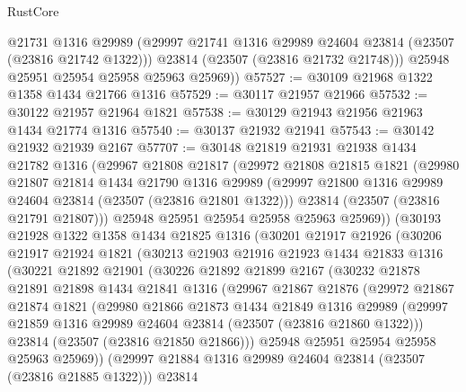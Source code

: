 \begin{lexlean}{RustCore}
\begin{coremodule}
          @21731
          @1316
          @29989
          (@29997 @21741 @1316 @29989 @24604 @23814 (@23507 (@23816 @21742 @1322)))
          @23814
          (@23507 (@23816 @21732 @21748)))
        @25948
        @25951
        @25954
        @25958
        @25963
        @25969))
@57527 := @30109 @21968 @1322 @1358 @1434 @21766 @1316
@57529 := @30117 @21957 @21966
@57532 := @30122 @21957 @21964 @1821
@57538 := @30129 @21943 @21956 @21963 @1434 @21774 @1316
@57540 := @30137 @21932 @21941
@57543 := @30142 @21932 @21939 @2167
@57707 := @30148
    @21819
    @21931
    @21938
    @1434
    @21782
    @1316
    (@29967
      @21808
      @21817
      (@29972
        @21808
        @21815
        @1821
        (@29980
          @21807
          @21814
          @1434
          @21790
          @1316
          @29989
          (@29997 @21800 @1316 @29989 @24604 @23814 (@23507 (@23816 @21801 @1322)))
          @23814
          (@23507 (@23816 @21791 @21807)))
        @25948
        @25951
        @25954
        @25958
        @25963
        @25969))
    (@30193
      @21928
      @1322
      @1358
      @1434
      @21825
      @1316
      (@30201
        @21917
        @21926
        (@30206
          @21917
          @21924
          @1821
          (@30213
            @21903
            @21916
            @21923
            @1434
            @21833
            @1316
            (@30221
              @21892
              @21901
              (@30226
                @21892
                @21899
                @2167
                (@30232
                  @21878
                  @21891
                  @21898
                  @1434
                  @21841
                  @1316
                  (@29967
                    @21867
                    @21876
                    (@29972
                      @21867
                      @21874
                      @1821
                      (@29980
                        @21866
                        @21873
                        @1434
                        @21849
                        @1316
                        @29989
                        (@29997 @21859 @1316 @29989 @24604 @23814 (@23507 (@23816 @21860 @1322)))
                        @23814
                        (@23507 (@23816 @21850 @21866)))
                      @25948
                      @25951
                      @25954
                      @25958
                      @25963
                      @25969))
                  (@29997 @21884 @1316 @29989 @24604 @23814 (@23507 (@23816 @21885 @1322)))
                  @23814

\end{coremodule}
\end{lexlean}
